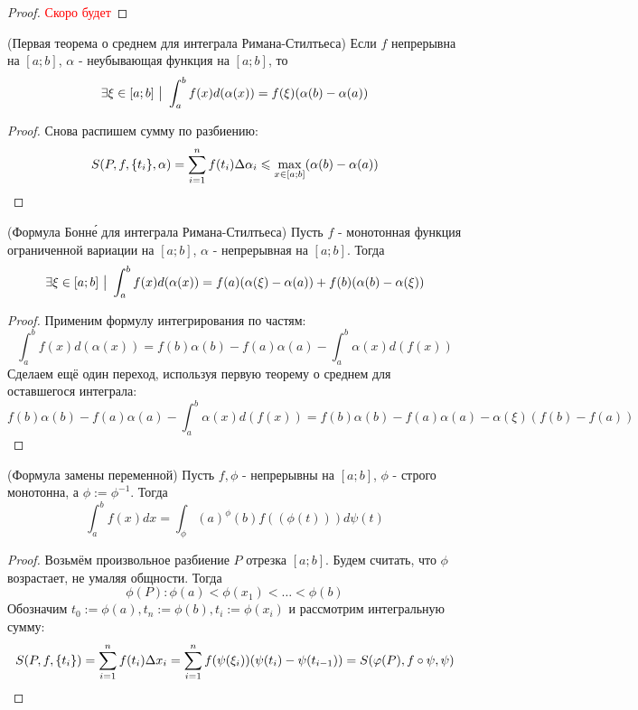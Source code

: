 \begin{proof}
	\textcolor{red}{Скоро будет}
\end{proof}

\begin{theorem} (Первая теорема о среднем для интеграла Римана-Стилтьеса)
	Если $f$ непрерывна на $[a; b]$, $\alpha$ - неубывающая функция на $[a; b]$, то
	\[
		\exists \xi \in [a; b] \ \big|\  \int_a^b f(x) d(\alpha(x)) = f(\xi)(\alpha(b) - \alpha(a))
	\]
\end{theorem}

\begin{proof}
	Снова распишем сумму по разбиению:
	\[
		S(P, f, \{t_i\}, \alpha) = \sum\limits_{i = 1}^n f(t_i) \Delta \alpha_i \leqslant \max\limits_{x \in [a; b]} (\alpha(b) - \alpha(a))
	\]
\end{proof}

\begin{theorem} (Формула Бонн\'{е} для интеграла Римана-Стилтьеса)
	Пусть $f$ - монотонная функция ограниченной вариации на $[a; b]$, $\alpha$ - непрерывная на $[a; b]$. Тогда
	\[
		\exists \xi \in [a; b] \ \big|\  \int_a^b f(x) d(\alpha(x)) = f(a)(\alpha(\xi) - \alpha(a)) + f(b)(\alpha(b) - \alpha(\xi))
	\]
\end{theorem}

\begin{proof}
	Применим формулу интегрирования по частям:
	\[
		\int_a^b f(x) d(\alpha(x)) = f(b)\alpha(b) - f(a)\alpha(a) - \int_a^b \alpha(x) d(f(x))
	\]
	Сделаем ещё один переход, используя первую теорему о среднем для оставшегося интеграла:
	\[
		f(b)\alpha(b) - f(a)\alpha(a) - \int_a^b \alpha(x) d(f(x)) = f(b)\alpha(b) - f(a)\alpha(a) - \alpha(\xi)(f(b) - f(a))
	\]
\end{proof}

\begin{theorem} (Формула замены переменной)
	Пусть $f, \phi$ - непрерывны на $[a; b]$, $\phi$ - строго монотонна, а $\phi := \phi^{-1}$. Тогда
	\[
		\int_a^b f(x)dx = \int_\phi(a)^\phi(b) f((\phi(t))) d\psi(t)
	\]
\end{theorem}

\begin{proof}
	Возьмём произвольное разбиение $P$ отрезка $[a; b]$. Будем считать, что $\phi$ возрастает, не умаляя общности. Тогда
	\[
		\phi(P) \colon \phi(a) < \phi(x_1) < \ldots < \phi(b)
	\]
	Обозначим $t_0 := \phi(a), t_n := \phi(b), t_i := \phi(x_i)$ и рассмотрим интегральную сумму:
	\[
		S(P, f, \{t_i\}) = \sum\limits_{i = 1}^n f(t_i) \Delta x_i = \sum\limits_{i = 1}^n f(\psi(\xi_i))(\psi(t_i) - \psi(t_{i - 1})) = S(\varphi(P), f \circ \psi, \psi)
	\]
\end{proof}

